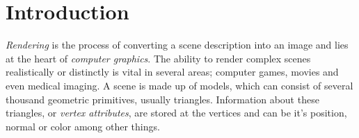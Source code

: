 


\chapter{Introduction}




\textit{Rendering} is the process of converting a scene description
into an image and lies at the heart of \textit{computer graphics}. The
ability to render complex scenes realistically or distinctly is vital
in several areas; computer games, movies and even medical imaging. A
scene is made up of models, which can consist of several thousand
geometric primitives, usually triangles. Information about these
triangles, or \textit{vertex attributes}, are stored at the vertices
and can be it's position, normal or color among other things.


